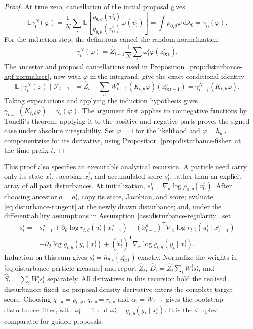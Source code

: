 \documentclass[11pt]{article}
\newcommand{\dd}{\mathrm{d}}
\begin{document}
\begin{proof}
At time zero, cancellation of the initial proposal gives
\[
 \mathbb E\gamma_0^N(\varphi)
 =\frac1N\sum_i\mathbb E\left[
       \frac{\rho_{0,\theta}(v_0^i)}{q_{0,\theta}(v_0^i)}
       \varphi(v_0^i)\right]
 =\int\rho_{0,\theta}\varphi\,\dd\lambda_0=\gamma_0(\varphi).
\]
For the induction step, the definitions cancel the random normalization:
\[
 \gamma_t^N(\varphi)
 =\widehat Z_{t-1}\frac1N\sum_i\omega_t^i\varphi(z_{0:t}^i).
\]
The ancestor and proposal cancellations used in
Proposition~\ref{prop:disturbance-apf-normalizer}, now with $\varphi$ in
the integrand, give the exact conditional identity
\begin{equation}
 \mathbb E[\gamma_t^N(\varphi)\mid\mathcal F_{t-1}]
 =\widehat Z_{t-1}\sum_aW_{t-1}^a
       (K_{t,\theta}\varphi)(z_{0:t-1}^a)
 =\gamma_{t-1}^N(K_{t,\theta}\varphi).
 \label{eq:disturbance-particle-induction-step}
\end{equation}
Taking expectations and applying the induction hypothesis gives
$\gamma_{t-1}(K_{t,\theta}\varphi)=\gamma_t(\varphi)$.
The argument first applies to nonnegative functions by Tonelli's theorem;
applying it to the positive and negative parts proves the signed case under
absolute integrability. Set $\varphi=1$ for the likelihood and
$\varphi=h_{\theta,t}$ componentwise for its derivative, using
Proposition~\ref{prop:disturbance-fisher} at the time prefix $t$.
\end{proof}

This proof also specifies an executable analytical recursion. A particle
need carry only its state $x_t^i$, Jacobian $\dot x_t^i$, and accumulated
score $s_t^i$, rather than an explicit array of all past disturbances.
At initialization, $s_0^i=\nabla_\theta\log\rho_{0,\theta}(v_0^i)$.
After choosing ancestor $a=a_t^i$, copy its state, Jacobian, and score;
evaluate \eqref{eq:disturbance-tangent} at the newly drawn disturbance; and,
under the differentiability assumptions in
Assumption~\ref{ass:disturbance-regularity}, set
\begin{align}
 s_t^i={}&s_{t-1}^a
 +\partial_\theta\log r_{t,\theta}(u_t^i\mid x_{t-1}^a)
 +(\dot x_{t-1}^a)^{\mathsf T}
          \nabla_x\log r_{t,\theta}(u_t^i\mid x_{t-1}^a)
 \nonumber\\
 &+\partial_\theta\log g_{t,\theta}(y_t\mid x_t^i)
 +(\dot x_t^i)^{\mathsf T}\nabla_x\log g_{t,\theta}(y_t\mid x_t^i).
 \label{eq:disturbance-analytical-score-recursion}
\end{align}
Induction on this sum gives $s_t^i=h_{\theta,t}(z_{0:t}^i)$ exactly.
Normalize the weights in \eqref{eq:disturbance-particle-measure} and report
$\widehat Z_t$, $\widehat D_t=\widehat Z_t\sum_iW_t^i s_t^i$, and
$\widehat S_t=\sum_iW_t^i s_t^i$ separately. All derivatives in this
recursion hold the realised disturbances fixed; no proposal-density
derivative enters the complete target score. Choosing
$q_{0,\theta}=\rho_{0,\theta}$, $q_{t,\theta}=r_{t,\theta}$ and
$\alpha_t=W_{t-1}$ gives the bootstrap disturbance filter, with
$\omega_0^i=1$ and $\omega_t^i=g_{t,\theta}(y_t\mid x_t^i)$.
It is the simplest comparator for guided proposals.
\end{document}
